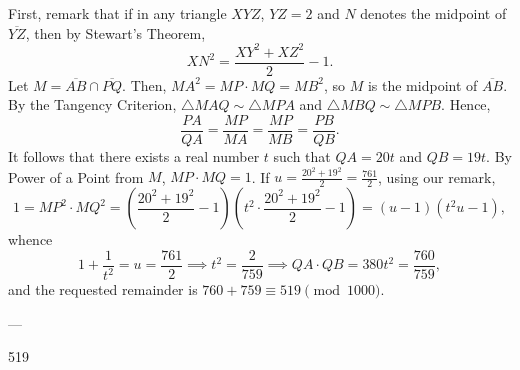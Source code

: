 First, remark that if in any triangle $XYZ$, $YZ=2$ and $N$ denotes the midpoint of $\overline{YZ}$, then by Stewart's Theorem, \[XN^2=\frac{XY^2+XZ^2}2-1.\]
Let $M=\overline{AB}\cap\overline{PQ}$. Then, $MA^2=MP\cdot MQ=MB^2$, so $M$ is the midpoint of $\overline{AB}$. By the Tangency Criterion, $\triangle MAQ\sim\triangle MPA$ and $\triangle MBQ\sim\triangle MPB$. Hence, \[\frac{PA}{QA}=\frac{MP}{MA}=\frac{MP}{MB}=\frac{PB}{QB}.\]
It follows that there exists a real number $t$ such that $QA=20t$ and $QB=19t$. By Power of a Point from $M$, $MP\cdot MQ=1$. If $u=\tfrac{20^2+19^2}2=\tfrac{761}2$, using our remark, \[1=MP^2\cdot MQ^2=\left(\frac{20^2+19^2}2-1\right)\left(t^2\cdot\frac{20^2+19^2}2-1\right)=(u-1)(t^2u-1),\]
whence \[1+\frac1{t^2}=u=\frac{761}2\implies t^2=\frac2{759}\implies QA\cdot QB=380t^2=\frac{760}{759},\]
and the requested remainder is $760+759\equiv 519\pmod{1000}$.

---

519
